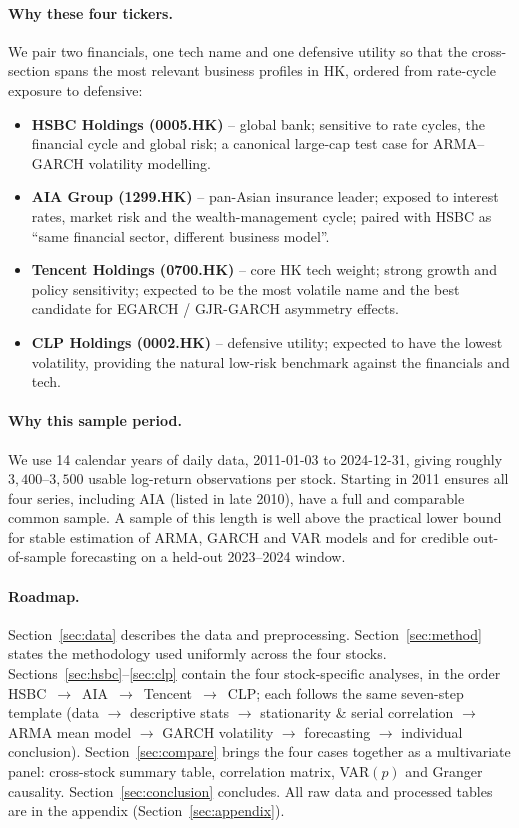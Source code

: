 \documentclass[11pt,a4paper]{article}
\begin{document}
\paragraph{Why these four tickers.}
We pair two financials, one tech name and one defensive utility so
that the cross-section spans the most relevant business profiles in
HK, ordered from rate-cycle exposure to defensive:
\begin{itemize}[leftmargin=*]
  \item \textbf{HSBC Holdings (0005.HK)} -- global bank; sensitive to
        rate cycles, the financial cycle and global risk; a canonical
        large-cap test case for ARMA--GARCH volatility modelling.
  \item \textbf{AIA Group (1299.HK)} -- pan-Asian insurance leader;
        exposed to interest rates, market risk and the
        wealth-management cycle; paired with HSBC as ``same financial
        sector, different business model''.
  \item \textbf{Tencent Holdings (0700.HK)} -- core HK tech weight;
        strong growth and policy sensitivity; expected to be the most
        volatile name and the best candidate for EGARCH / GJR-GARCH
        asymmetry effects.
  \item \textbf{CLP Holdings (0002.HK)} -- defensive utility; expected
        to have the lowest volatility, providing the natural
        low-risk benchmark against the financials and tech.
\end{itemize}

\paragraph{Why this sample period.}
We use 14 calendar years of daily data, 2011-01-03 to 2024-12-31,
giving roughly $3{,}400$--$3{,}500$ usable log-return observations per
stock.  Starting in 2011 ensures all four series, including AIA
(listed in late 2010), have a full and comparable common sample.
A sample of this length is well above the practical lower bound for
stable estimation of ARMA, GARCH and VAR models and for credible
out-of-sample forecasting on a held-out 2023--2024 window.

\paragraph{Roadmap.}
Section~\ref{sec:data} describes the data and preprocessing.
Section~\ref{sec:method} states the methodology used uniformly across
the four stocks.  Sections~\ref{sec:hsbc}--\ref{sec:clp} contain the
four stock-specific analyses, in the order
HSBC~$\to$~AIA~$\to$~Tencent~$\to$~CLP; each follows the same
seven-step template (data $\to$ descriptive stats $\to$ stationarity
\& serial correlation $\to$ ARMA mean model $\to$ GARCH volatility
$\to$ forecasting $\to$ individual conclusion).
Section~\ref{sec:compare} brings the four cases together as a
multivariate panel: cross-stock summary table, correlation matrix,
VAR$(p)$ and Granger causality.  Section~\ref{sec:conclusion}
concludes.  All raw data and processed tables are in the
appendix (Section~\ref{sec:appendix}).
\end{document}

